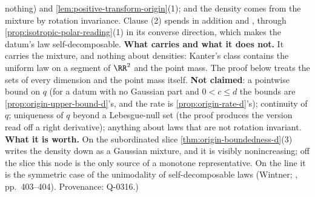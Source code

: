 \begin{proposition}
{nothing) and \ref{lem:positive-transform-origin}(1); and the density comes from the mixture by
rotation invariance. Clause (2) spends in addition  and , through
\ref{prop:isotropic-polar-reading}(1) in its converse direction, which makes the datum's law
self-decomposable. \textbf{What  carries and what it does not.} It carries the mixture,
and nothing about densities: Kanter's class contains the uniform law on a segment of $\RR^2$ and
the point mass. The proof below treats the sets of every dimension and the point mass itself.
\textbf{Not claimed}: a pointwise bound on $q$ (for a datum with no Gaussian part and
$0 < c \le d$ the bounds are \ref{prop:origin-upper-bound-d}'s, and the rate is
\ref{prop:origin-rate-d}'s);
continuity of $q$; uniqueness of $q$ beyond a Lebesgue-null set (the proof produces the version
read off a right derivative); anything about laws that are not rotation invariant. \textbf{What it
is worth.} On the subordinated slice \ref{thm:origin-boundedness-d}(3) writes the density down as a
Gaussian mixture, and it is visibly nonincreasing; off the slice this node is the only source of a
monotone representative. On the line it is the symmetric case of the unimodality of
self-decomposable laws (Wintner; , pp.~403--404). Provenance: Q-0316.)}
\end{proposition}

